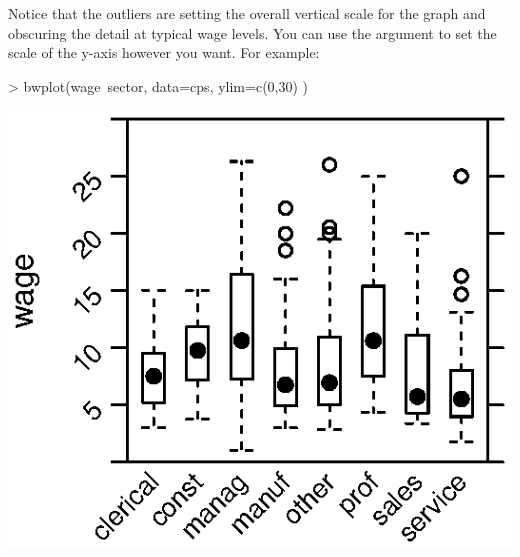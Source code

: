 
Notice that the outliers are setting the overall vertical scale for
the graph and obscuring the detail at typical wage levels.  You can
use the  argument to set the scale of the y-axis however
you want. For example:

\begin{Schunk}
\begin{Sinput}
> bwplot(wage~sector, data=cps, ylim=c(0,30) )
\end{Sinput}
\end{Schunk}

\includegraphics{Figures/language-box3}

